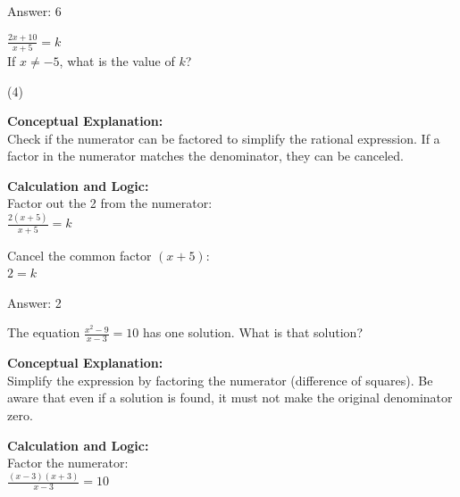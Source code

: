 \documentclass[11pt,paper=a4,answers]{exam}
\begin{document}
\begin{questions}
\begin{solution}
\vspace{25pt}

Answer: \colorbox{yellow!100}{6}
\end{solution}

\vspace{40pt}

\question
$\frac{2x + 10}{x + 5} = k$ \\
If $x \neq -5$, what is the value of $k$?
\begin{tasks}(4)
\end{tasks}

\begin{solution}
\textbf{Conceptual Explanation:} \\
Check if the numerator can be factored to simplify the rational expression. If a factor in the numerator matches the denominator, they can be canceled.

\vspace{20pt}

\textbf{Calculation and Logic:} \\
Factor out the 2 from the numerator: \\
$\frac{2(x + 5)}{x + 5} = k$

\vspace{10pt}

Cancel the common factor $(x+5)$: \\
$2 = k$

\vspace{25pt}

Answer: \colorbox{yellow!100}{2}
\end{solution}

\vspace{40pt}

\question
The equation $\frac{x^2 - 9}{x - 3} = 10$ has one solution. What is that solution?

\begin{solution}
\textbf{Conceptual Explanation:} \\
Simplify the expression by factoring the numerator (difference of squares). Be aware that even if a solution is found, it must not make the original denominator zero.

\vspace{20pt}

\textbf{Calculation and Logic:} \\
Factor the numerator: \\
$\frac{(x-3)(x+3)}{x-3} = 10$


\end{solution}
\end{questions}
\end{document}
